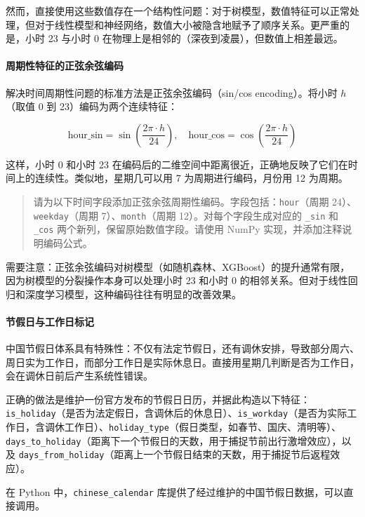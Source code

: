 然而，直接使用这些数值存在一个结构性问题：对于树模型，数值特征可以正常处理，但对于线性模型和神经网络，数值大小被隐含地赋予了顺序关系。更严重的是，小时 23 与小时 0 在物理上是相邻的（深夜到凌晨），但数值上相差最远。

\paragraph{周期性特征的正弦余弦编码}

解决时间周期性问题的标准方法是正弦余弦编码（sin/cos encoding）。将小时 $h$（取值 0 到 23）编码为两个连续特征：

\[
  \text{hour\_sin} = \sin\!\left(\frac{2\pi \cdot h}{24}\right), \quad
  \text{hour\_cos} = \cos\!\left(\frac{2\pi \cdot h}{24}\right)
\]

这样，小时 0 和小时 23 在编码后的二维空间中距离很近，正确地反映了它们在时间上的连续性。类似地，星期几可以用 7 为周期进行编码，月份用 12 为周期。

\begin{quote}
请为以下时间字段添加正弦余弦周期性编码。字段包括：\texttt{hour}（周期 24）、\texttt{weekday}（周期 7）、\texttt{month}（周期 12）。对每个字段生成对应的 \texttt{\_sin} 和 \texttt{\_cos} 两个新列，保留原始数值字段。请使用 NumPy 实现，并添加注释说明编码公式。
\end{quote}

需要注意：正弦余弦编码对树模型（如随机森林、XGBoost）的提升通常有限，因为树模型的分裂操作本身可以处理小时 23 和小时 0 的相邻关系。但对于线性回归和深度学习模型，这种编码往往有明显的改善效果。

\paragraph{节假日与工作日标记}

中国节假日体系具有特殊性：不仅有法定节假日，还有调休安排，导致部分周六、周日实为工作日，而部分工作日是实际休息日。直接用星期几判断是否为工作日，会在调休日前后产生系统性错误。

正确的做法是维护一份官方发布的节假日日历，并据此构造以下特征：\texttt{is\_holiday}（是否为法定假日，含调休后的休息日）、\texttt{is\_workday}（是否为实际工作日，含调休工作日）、\texttt{holiday\_type}（假日类型，如春节、国庆、清明等）、\texttt{days\_to\_holiday}（距离下一个节假日的天数，用于捕捉节前出行激增效应），以及 \texttt{days\_from\_holiday}（距离上一个节假日结束的天数，用于捕捉节后返程效应）。

在 Python 中，\texttt{chinese\_calendar} 库提供了经过维护的中国节假日数据，可以直接调用。

